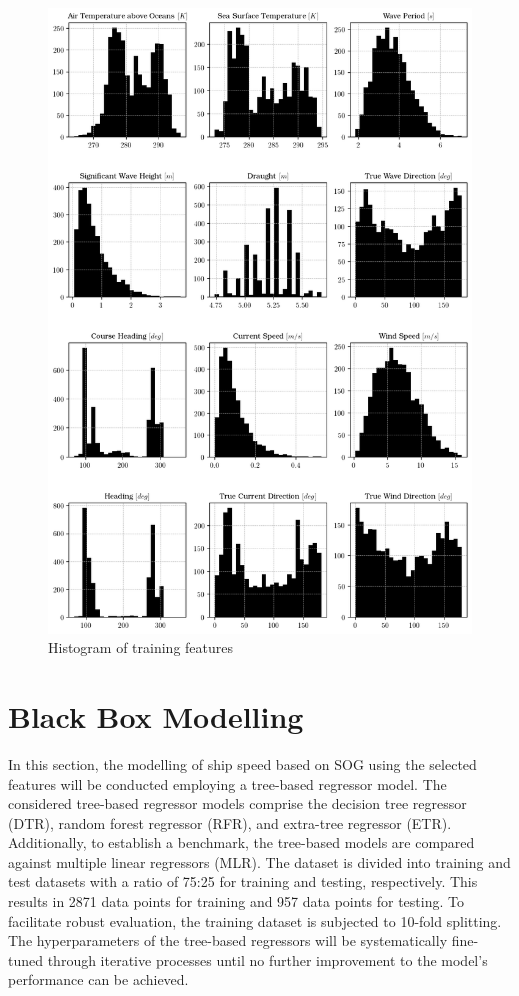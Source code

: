 \begin{figure}
    \centering
    \includegraphics[width=.9\linewidth]{02_figures/hist_init_preprocessing.png}
    \caption{Histogram of training features}
    \label{fig:hist_training_ftr_label}
\end{figure}

\section{Black Box Modelling}\label{sec:BBM_modelling}

In this section, the modelling of ship speed based on SOG using the selected features will be conducted employing a tree-based regressor model. The considered tree-based regressor models comprise the decision tree regressor (DTR), random forest regressor (RFR), and extra-tree regressor (ETR). Additionally, to establish a benchmark, the tree-based models are compared against multiple linear regressors (MLR). The dataset is divided into training and test datasets with a ratio of 75:25 for training and testing, respectively. This results in 2871 data points for training and 957 data points for testing. To facilitate robust evaluation, the training dataset is subjected to 10-fold splitting. The hyperparameters of the tree-based regressors will be systematically fine-tuned through iterative processes until no further improvement to the model's performance can be achieved.\\


